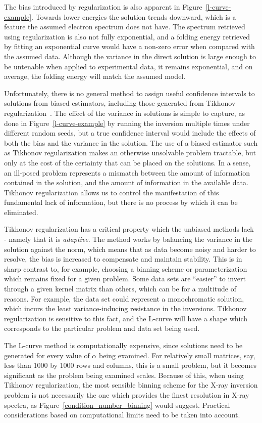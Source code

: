 The bias introduced by regularization is also apparent in Figure~\ref{l-curve-example}. Towards lower energies the solution trends downward, which is a feature the assumed electron spectrum does not have. The spectrum retrieved using regularization is also not fully exponential, and a folding energy retrieved by fitting an exponential curve would have a non-zero error when compared with the assumed data. Although the variance in the direct solution is large enough to be untenable when applied to experimental data, it remains exponential, and on average, the folding energy will match the assumed model. 

Unfortunately, there is no general method to assign useful confidence intervals to solutions from biased estimators, including those generated from Tikhonov regularization~\citep{Goeman2012}. The effect of the variance in solutions is simple to capture, as done in Figure~\ref{l-curve-example} by running the inversion multiple times under different random seeds, but a true confidence interval would include the effects of both the bias and the variance in the solution. The use of a biased estimator such as Tikhonov regularization  makes an otherwise unsolvable problem tractable, but only at the cost of the certainty that can be placed on the solutions. In a sense, an ill-posed problem represents a mismatch between the amount of information contained in the solution, and the amount of information in the available data. Tikhonov regularization allows us to control the manifestation of this fundamental lack of information, but there is no process by which it can be eliminated. 

 Tikhonov regularization has a critical property which the unbiased methods lack - namely that it is \textit{adaptive}. The method works by balancing the variance in the solution against the norm, which means that as data become noisy and harder to resolve, the bias is increased to compensate and maintain stability. This is in sharp contrast to, for example, choosing a binning scheme or parameterization which remains fixed for a given problem. Some data sets are ``easier'' to invert through a given kernel matrix than others, which can be for a multitude of reasons. For example, the data set could represent a monochromatic solution, which incurs the least variance-inducing resistance in the inversions. Tikhonov regularization is sensitive to this fact, and the L-curve will have a shape which corresponds to the particular problem and data set being used. 

The L-curve method is computationally expensive, since solutions need to be generated for every value of $\alpha$ being examined. For relatively small matrices, say, less than 1000 by 1000 rows and columns, this is a small problem, but it becomes significant as the problem being examined scales. Because of this, when using Tikhonov regularization, the most sensible binning scheme for the X-ray inversion problem is not necessarily the one which provides the finest resolution in X-ray spectra, as Figure~\ref{condition_number_binning} would suggest. Practical considerations based on computational limits need to be taken into account. 

